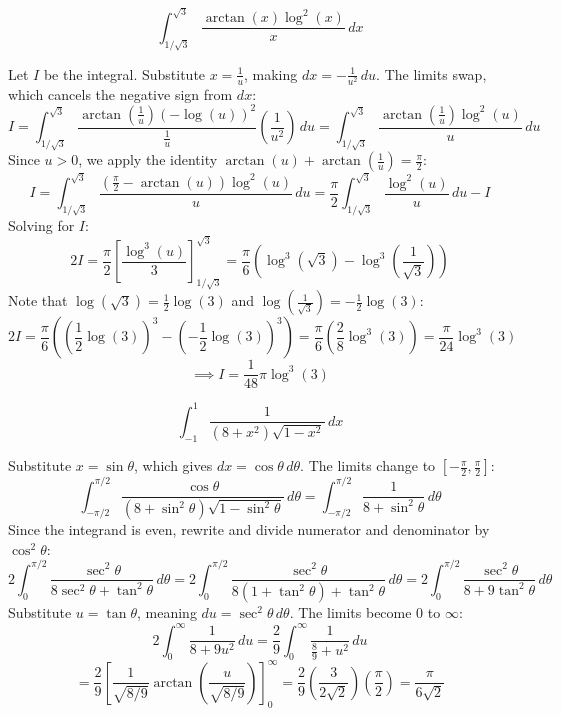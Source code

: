 \begin{questions}
    \question \[ \int_{1/\sqrt{3}}^{\sqrt{3}} \frac{\arctan(x) \log^2(x)}{x} \,dx \]
    \begin{solution}
        Let $I$ be the integral. Substitute $x = \frac{1}{u}$, making $dx = -\frac{1}{u^2} \,du$. The limits swap, which cancels the negative sign from $dx$:
        \[ I = \int_{1/\sqrt{3}}^{\sqrt{3}} \frac{\arctan\left(\frac{1}{u}\right) (-\log(u))^2}{\frac{1}{u}} \left(\frac{1}{u^2}\right) \,du = \int_{1/\sqrt{3}}^{\sqrt{3}} \frac{\arctan\left(\frac{1}{u}\right) \log^2(u)}{u} \,du \]
        Since $u > 0$, we apply the identity $\arctan(u) + \arctan\left(\frac{1}{u}\right) = \frac{\pi}{2}$:
        \[ I = \int_{1/\sqrt{3}}^{\sqrt{3}} \frac{\left(\frac{\pi}{2} - \arctan(u)\right) \log^2(u)}{u} \,du = \frac{\pi}{2} \int_{1/\sqrt{3}}^{\sqrt{3}} \frac{\log^2(u)}{u} \,du - I \]
        Solving for $I$:
        \[ 2I = \frac{\pi}{2} \left[ \frac{\log^3(u)}{3} \right]_{1/\sqrt{3}}^{\sqrt{3}} = \frac{\pi}{6} \left( \log^3\left(\sqrt{3}\right) - \log^3\left(\frac{1}{\sqrt{3}}\right) \right) \]
        Note that $\log(\sqrt{3}) = \frac{1}{2}\log(3)$ and $\log\left(\frac{1}{\sqrt{3}}\right) = -\frac{1}{2}\log(3)$:
        \[ 2I = \frac{\pi}{6} \left( \left(\frac{1}{2}\log(3)\right)^3 - \left(-\frac{1}{2}\log(3)\right)^3 \right) = \frac{\pi}{6} \left( \frac{2}{8}\log^3(3) \right) = \frac{\pi}{24} \log^3(3) \]
        \[ \implies I = \frac{1}{48}\pi\log^3(3) \]
    \end{solution}

    \question \[ \int_{-1}^1 \frac{1}{(8 + x^2)\sqrt{1 - x^2}} \,dx \]
    \begin{solution}
        Substitute $x = \sin\theta$, which gives $dx = \cos\theta \,d\theta$. The limits change to $[-\frac{\pi}{2}, \frac{\pi}{2}]$:
        \[ \int_{-\pi/2}^{\pi/2} \frac{\cos\theta}{(8 + \sin^2\theta)\sqrt{1 - \sin^2\theta}} \,d\theta = \int_{-\pi/2}^{\pi/2} \frac{1}{8 + \sin^2\theta} \,d\theta \]
        Since the integrand is even, rewrite and divide numerator and denominator by $\cos^2\theta$:
        \[ 2 \int_0^{\pi/2} \frac{\sec^2\theta}{8\sec^2\theta + \tan^2\theta} \,d\theta = 2 \int_0^{\pi/2} \frac{\sec^2\theta}{8(1 + \tan^2\theta) + \tan^2\theta} \,d\theta = 2 \int_0^{\pi/2} \frac{\sec^2\theta}{8 + 9\tan^2\theta} \,d\theta \]
        Substitute $u = \tan\theta$, meaning $du = \sec^2\theta \,d\theta$. The limits become $0$ to $\infty$:
        \[ 2 \int_0^\infty \frac{1}{8 + 9u^2} \,du = \frac{2}{9} \int_0^\infty \frac{1}{\frac{8}{9} + u^2} \,du \]
        \[ = \frac{2}{9} \left[ \frac{1}{\sqrt{8/9}} \arctan\left(\frac{u}{\sqrt{8/9}}\right) \right]_0^\infty = \frac{2}{9} \left( \frac{3}{2\sqrt{2}} \right) \left(\frac{\pi}{2}\right) = \frac{\pi}{6\sqrt{2}} \]
    \end{solution}


\end{questions}
